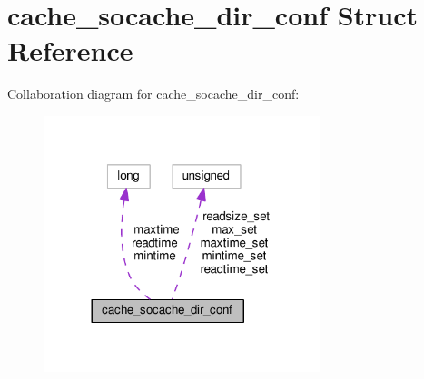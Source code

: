 \hypertarget{structcache__socache__dir__conf}{}\section{cache\+\_\+socache\+\_\+dir\+\_\+conf Struct Reference}
\label{structcache__socache__dir__conf}


Collaboration diagram for cache\+\_\+socache\+\_\+dir\+\_\+conf\+:
\nopagebreak
\begin{figure}[H]
\begin{center}
\leavevmode
\includegraphics[width=228pt]{structcache__socache__dir__conf__coll__graph}
\end{center}
\end{figure}
